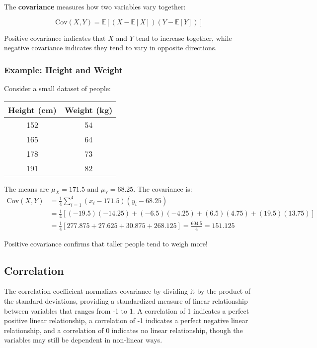 The \textbf{covariance} measures how two variables vary together:

\begin{equation}
\text{Cov}(X, Y) = \mathbb{E}[(X - \mathbb{E}[X])(Y - \mathbb{E}[Y])]
\end{equation}

Positive covariance indicates that $X$ and $Y$ tend to increase together, while negative covariance indicates they tend to vary in opposite directions.

\subsubsection{Example: Height and Weight}

Consider a small dataset of people:
\begin{center}
\begin{tabular}{|c|c|}
\hline
Height (cm) & Weight (kg) \\
\hline
152 & 54 \\
165 & 64 \\
178 & 73 \\
191 & 82 \\
\hline
\end{tabular}
\end{center}

The means are $\mu_X = 171.5$ and $\mu_Y = 68.25$. The covariance is:
\begin{align}
\text{Cov}(X,Y) &= \frac{1}{4}\sum_{i=1}^{4}(x_i - 171.5)(y_i - 68.25) \\
&= \frac{1}{4}[(-19.5)(-14.25) + (-6.5)(-4.25) + (6.5)(4.75) + (19.5)(13.75)] \\
&= \frac{1}{4}[277.875 + 27.625 + 30.875 + 268.125] = \frac{604.5}{4} = 151.125
\end{align}

Positive covariance confirms that taller people tend to weigh more!

\subsection{Correlation}

The correlation coefficient normalizes covariance by dividing it by the product of the standard deviations, providing a standardized measure of linear relationship between variables that ranges from -1 to 1. A correlation of 1 indicates a perfect positive linear relationship, a correlation of -1 indicates a perfect negative linear relationship, and a correlation of 0 indicates no linear relationship, though the variables may still be dependent in non-linear ways.
